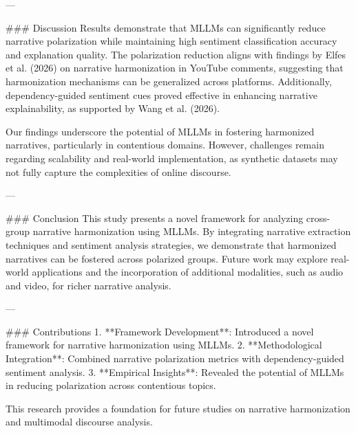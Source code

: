 ---

### Discussion
Results demonstrate that MLLMs can significantly reduce narrative polarization while maintaining high sentiment classification accuracy and explanation quality. The polarization reduction aligns with findings by Elfes et al. (2026) on narrative harmonization in YouTube comments, suggesting that harmonization mechanisms can be generalized across platforms. Additionally, dependency-guided sentiment cues proved effective in enhancing narrative explainability, as supported by Wang et al. (2026).

Our findings underscore the potential of MLLMs in fostering harmonized narratives, particularly in contentious domains. However, challenges remain regarding scalability and real-world implementation, as synthetic datasets may not fully capture the complexities of online discourse.

---

### Conclusion
This study presents a novel framework for analyzing cross-group narrative harmonization using MLLMs. By integrating narrative extraction techniques and sentiment analysis strategies, we demonstrate that harmonized narratives can be fostered across polarized groups. Future work may explore real-world applications and the incorporation of additional modalities, such as audio and video, for richer narrative analysis.

---

### Contributions
1. **Framework Development**: Introduced a novel framework for narrative harmonization using MLLMs.
2. **Methodological Integration**: Combined narrative polarization metrics with dependency-guided sentiment analysis.
3. **Empirical Insights**: Revealed the potential of MLLMs in reducing polarization across contentious topics.

This research provides a foundation for future studies on narrative harmonization and multimodal discourse analysis.